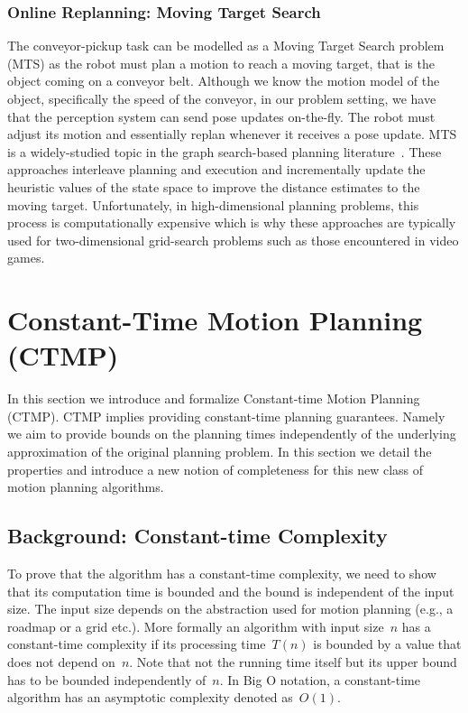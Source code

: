 \documentclass[a4paper]{report}
\begin{document}
\subsection{Online Replanning: Moving Target Search}
The conveyor-pickup task can be modelled as a Moving Target Search problem (MTS) as the robot must plan a motion to reach a moving target, that is the object coming on a conveyor belt. Although we know the motion model of the object, specifically the speed of the conveyor, in our problem setting, we have that the perception system can send pose updates on-the-fly. The robot must adjust its motion and essentially replan whenever it receives a pose update. MTS is a widely-studied topic in the graph search-based planning literature~\cite{ishida1991moving,ishida1995moving,koenig2007speeding,sun2010moving}. 
These approaches interleave planning and execution and incrementally update the heuristic values of the state space to improve the distance estimates to the moving target. Unfortunately, in high-dimensional planning problems, this process is computationally expensive which is why these approaches are typically used for two-dimensional grid-search problems such as those encountered in video games.


\newpage
\chapter{Constant-Time Motion Planning (CTMP)}
\label{sec:ctmp}
In this section we introduce and formalize Constant-time Motion Planning (CTMP). CTMP implies providing constant-time planning guarantees. Namely we aim to provide bounds on the planning times independently of the underlying approximation of the original planning problem. In this section we detail the properties and introduce a new notion of completeness for this new class of motion planning algorithms. 

\section{Background: Constant-time Complexity}
To prove that the algorithm has a constant-time complexity, we need to show that its computation time is bounded and the bound is independent of the input size. The input size depends on the abstraction used for motion planning (e.g., a roadmap or a grid etc.). More formally an algorithm with input size~$n$ has a constant-time complexity if its processing time~$T(n)$ is bounded by a value that does not depend on~$n$.
Note that not the running time itself but its upper bound has to be bounded independently of~$n$. In Big O notation, a constant-time algorithm has an asymptotic complexity denoted as~$O(1)$.
\end{document}
